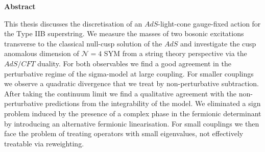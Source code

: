 %
%
\begin{center}
{\sffamily \bfseries\Large Abstract}\\
\end{center}%
\vspace{1cm}
%
This thesis discusses the discretisation of an $AdS$-light-cone gauge-fixed action for the Type IIB  superstring. We measure the masses of two bosonic excitations transverse to the classical null-cusp solution of the $AdS$  and investigate the cusp anomalous dimension of $\mathcal{N}=4$	SYM from a string theory perspective via the $AdS/CFT$ duality. For both observables we find a good agreement in the perturbative regime of the sigma-model at large  coupling. For smaller couplings we observe a quadratic divergence that we treat by non-perturbative subtraction. After taking the continuum limit we find a qualitative agreement with the non-perturbative predictions from the integrability of the model. We eliminated a sign problem induced by the presence of a complex phase in the fermionic determinant by introducing an alternative fermionic linearisation. For small couplings we then face the problem of treating operators with small eigenvalues, not effectively treatable via reweighting.\\
\vspace{1.5cm}

